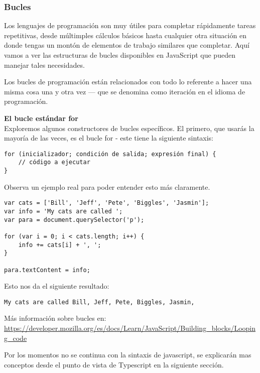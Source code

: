 \begin{enumerate}
\subsubsection{Bucles}

Los lenguajes de programación son muy útiles para completar rápidamente tareas repetitivas, desde múltimples cálculos básicos hasta cualquier otra situación en donde tengas un montón de elementos de trabajo similares que completar. Aquí vamos a ver las estructuras de bucles disponibles en JavaScript que pueden manejar tales necesidades.

Los bucles de programación están relacionados con todo lo referente a hacer una misma cosa una y otra vez — que se denomina como iteración en el idioma de programación.

\textbf{El bucle estándar for}
\\
Exploremos algunos constructores de bucles específicos. El primero, que usarás la mayoría de las veces, es el bucle for - este tiene la siguiente sintaxis:

\begin{lstlisting}
for (inicializador; condición de salida; expresión final) {
	// código a ejecutar
}
\end{lstlisting}

Observa un ejemplo real para poder entender esto más claramente.

\begin{lstlisting}
var cats = ['Bill', 'Jeff', 'Pete', 'Biggles', 'Jasmin'];
var info = 'My cats are called ';
var para = document.querySelector('p');

for (var i = 0; i < cats.length; i++) {
	info += cats[i] + ', ';
}

para.textContent = info;
\end{lstlisting}

Esto nos da el siguiente resultado:

\begin{lstlisting}
My cats are called Bill, Jeff, Pete, Biggles, Jasmin,
\end{lstlisting}

\begin{remark}
Más información sobre bucles en:
\url{https://developer.mozilla.org/es/docs/Learn/JavaScript/Building_blocks/Looping_code}
\end{remark}

Por los momentos no se continua con la sintaxis de javascript, se explicarán mas conceptos desde el punto de vista de Typescript en la siguiente sección.




\end{enumerate}
